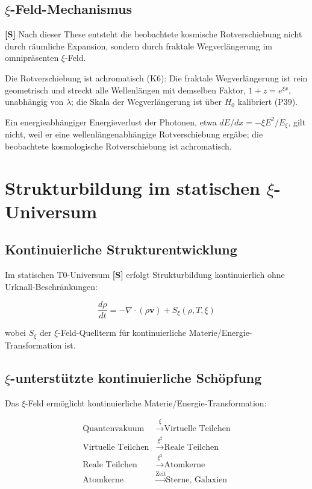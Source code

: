 	\subsection{$\xi$-Feld-Mechanismus}
	
	\begin{revolutionary}[These]
		\textbf{[S]} Nach dieser These entsteht die beobachtete kosmische Rotverschiebung nicht durch räumliche Expansion, sondern durch fraktale Wegverlängerung im omnipräsenten $\xi$-Feld.
	\end{revolutionary}
	
	Die Rotverschiebung ist achromatisch (K6): Die fraktale Wegverlängerung ist rein geometrisch und streckt alle Wellenlängen mit demselben Faktor, $1+z = e^{\xi x}$, unabhängig von $\lambda$; die Skala der Wegverlängerung ist über $H_0$ kalibriert (P39).
	
	Ein energieabhängiger Energieverlust der Photonen, etwa $dE/dx = -\xi E^2/E_\xi$, gilt nicht, weil er eine wellenlängenabhängige Rotverschiebung ergäbe; die beobachtete kosmologische Rotverschiebung ist achromatisch.
	
	\section{Strukturbildung im statischen $\xi$-Universum}
	
	\subsection{Kontinuierliche Strukturentwicklung}
	
	Im statischen T0-Universum \textbf{[S]} erfolgt Strukturbildung kontinuierlich ohne Urknall-Beschränkungen:
	
	\begin{equation}
		\frac{d\rho}{dt} = -\nabla \cdot (\rho \mathbf{v}) + S_\xi(\rho, T, \xi)
	\end{equation}
	
	wobei $S_\xi$ der $\xi$-Feld-Quellterm für kontinuierliche Materie/Energie-Transformation ist.
	
	\subsection{$\xi$-unterstützte kontinuierliche Schöpfung}
	
	Das $\xi$-Feld ermöglicht kontinuierliche Materie/Energie-Transformation:
	
	\begin{align}
		\text{Quantenvakuum} &\xrightarrow{\xi} \text{Virtuelle Teilchen} \\
		\text{Virtuelle Teilchen} &\xrightarrow{\xi^2} \text{Reale Teilchen} \\
		\text{Reale Teilchen} &\xrightarrow{\xi^3} \text{Atomkerne} \\
		\text{Atomkerne} &\xrightarrow{\text{Zeit}} \text{Sterne, Galaxien}
	\end{align}
	
